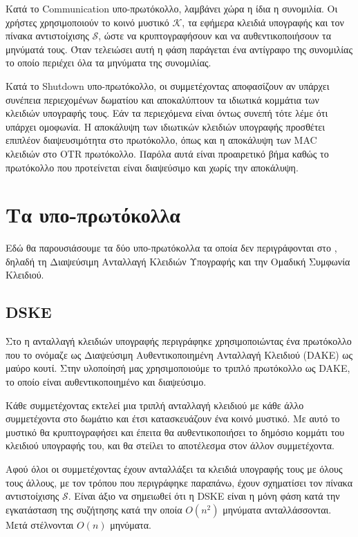Κατά το Communication υπο-πρωτόκολλο, λαμβάνει χώρα η ίδια η συνομιλία.
Οι χρήστες χρησιμοποιούν το κοινό μυστικό $\mathcal{K}$, τα εφήμερα κλειδιά υπογραφής και τον πίνακα αντιστοίχισης $\mathcal{S}$, ώστε να κρυπτογραφήσουν και να αυθεντικοποιήσουν τα μηνύματά τους.
Όταν τελειώσει αυτή η φάση παράγεται ένα αντίγραφο της συνομιλίας το οποίο περιέχει όλα τα μηνύματα της συνομιλίας.

Κατά το Shutdown υπο-πρωτόκολλο, οι συμμετέχοντας αποφασίζουν αν υπάρχει συνέπεια περιεχομένων δωματίου και αποκαλύπτουν τα ιδιωτικά κομμάτια των κλειδιών υπογραφής τους.
Εάν τα περιεχόμενα είναι όντως συνεπή τότε λέμε ότι υπάρχει ομοφωνία.
Η αποκάλυψη των ιδιωτικών κλειδιών υπογραφής προσθέτει επιπλέον διαψευσιμότητα στο πρωτόκολλο, όπως και η αποκάλυψη των MAC κλειδιών στο OTR πρωτόκολλο.
Παρόλα αυτά είναι προαιρετικό βήμα καθώς το πρωτόκολλο που προτείνεται είναι διαψεύσιμο και χωρίς την αποκάλυψη.

\section{Τα υπο-πρωτόκολλα}
\label{subprots}

Εδώ θα παρουσιάσουμε τα δύο υπο-πρωτόκολλα τα οποία δεν περιγράφονται στο \cite{mpotr}, δηλαδή τη Διαψεύσιμη Ανταλλαγή Κλειδιών Υπογραφής και την Ομαδική Συμφωνία Κλειδιού.

\subsection{DSKE}
\label{dske_subprot}

Στο\cite{mpotr} η ανταλλαγή κλειδιών υπογραφής περιγράφηκε χρησιμοποιώντας ένα πρωτόκολλο που το ονόμαζε ως Διαψεύσιμη Αυθεντικοποιημένη Ανταλλαγή Κλειδιού (DAKE) ως μαύρο κουτί.
Στην υλοποίησή μας χρησιμοποιούμε το τριπλό \dhname πρωτόκολλο ως DAKE, το οποίο είναι αυθεντικοποιημένο και διαψεύσιμο.

Κάθε συμμετέχοντας εκτελεί μια τριπλή \dhname ανταλλαγή κλειδιού με κάθε άλλο συμμετέχοντα στο δωμάτιο και έτσι κατασκευάζουν ένα κοινό μυστικό.
Με αυτό το μυστικό θα κρυπτογραφήσει και έπειτα θα αυθεντικοποιήσει το δημόσιο κομμάτι του κλειδιού υπογραφής του, και θα στείλει το αποτέλεσμα στον άλλον συμμετέχοντα.

Αφού όλοι οι συμμετέχοντας έχουν ανταλλάξει τα κλειδιά υπογραφής τους με όλους τους άλλους, με τον τρόπου που περιγράφηκε παραπάνω, έχουν σχηματίσει τον πίνακα αντιστοίχισης $\mathcal{S}$.
Είναι άξιο να σημειωθεί ότι η DSKE είναι η μόνη φάση κατά την εγκατάσταση της συζήτησης κατά την οποία $O(n^2)$ μηνύματα ανταλλάσσονται.
Μετά στέλνονται $O(n)$ μηνύματα.


